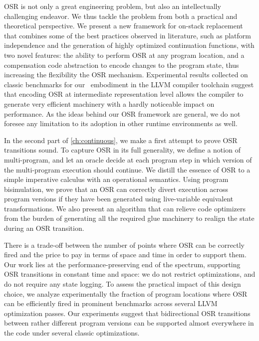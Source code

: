 OSR is not only a great engineering problem, but also an intellectually challenging endeavor. We thus tackle the problem from both a practical and theoretical perspective. We present a new framework for on-stack replacement that combines some of the best practices observed in literature, such as platform independence and the generation of highly optimized continuation functions, with two novel features: the ability to perform OSR at any program location, and a compensation code abstraction to encode changes to the program state, thus increasing the flexibility the OSR mechanism. Experimental results collected on classic benchmarks for our \osrkit\ embodiment in the LLVM compiler toolchain suggest that encoding OSR at intermediate representation level allows the compiler to generate very efficient machinery with a hardly noticeable impact on performance. As the ideas behind our OSR framework are general, we do not foresee any limitation to its adoption in other runtime environments as well.

In the second part of \mychapter\ref{ch:continuous}, we make a first attempt to prove OSR transitions sound. To capture OSR in its full generality, we define a notion of multi-program, and let an oracle decide at each program step in which version of the multi-program execution should continue. We distill the essence of OSR to a simple imperative calculus with an operational semantics. Using program bisimulation, we prove that an OSR can correctly divert execution across program versions if they have been generated using live-variable equivalent transformations. We also present an algorithm that can relieve code optimizers from the burden of generating all the required glue machinery to realign the state during an OSR transition.

There is a trade-off between the number of points where OSR can be correctly fired and the price to pay in terms of space and time in order to support them. Our work lies at the performance-preserving end of the spectrum, supporting OSR transitions in constant time and space: we do not restrict optimizations, and do not require any state logging. To assess the practical impact of this design choice, we analyze experimentally the fraction of program locations where OSR can be efficiently fired in prominent benchmarks across several LLVM optimization passes. Our experiments suggest that bidirectional OSR transitions between rather different program versions can be supported almost everywhere in the code under several classic optimizations.

